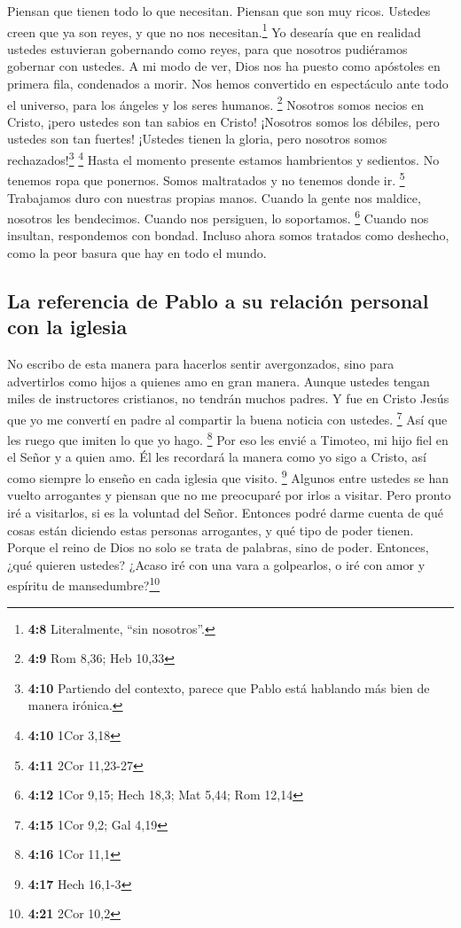  Piensan que tienen todo lo que necesitan. Piensan que son
muy ricos. Ustedes creen que ya son reyes, y que no nos
necesitan.\footnote{\textbf{4:8} Literalmente, ``sin nosotros''.} Yo
desearía que en realidad ustedes estuvieran gobernando como reyes, para
que nosotros pudiéramos gobernar con ustedes.  A mi modo
de ver, Dios nos ha puesto como apóstoles en primera fila, condenados a
morir. Nos hemos convertido en espectáculo ante todo el universo, para
los ángeles y los seres humanos. \footnote{\textbf{4:9} Rom 8,36; Heb
  10,33}  Nosotros somos necios en Cristo, ¡pero ustedes
son tan sabios en Cristo! ¡Nosotros somos los débiles, pero ustedes son
tan fuertes! ¡Ustedes tienen la gloria, pero nosotros somos
rechazados!\footnote{\textbf{4:10} Partiendo del contexto, parece que
  Pablo está hablando más bien de manera irónica.} \footnote{\textbf{4:10}
  1Cor 3,18}  Hasta el momento presente estamos
hambrientos y sedientos. No tenemos ropa que ponernos. Somos maltratados
y no tenemos donde ir. \footnote{\textbf{4:11} 2Cor 11,23-27}
 Trabajamos duro con nuestras propias manos. Cuando la
gente nos maldice, nosotros les bendecimos. Cuando nos persiguen, lo
soportamos. \footnote{\textbf{4:12} 1Cor 9,15; Hech 18,3; Mat 5,44; Rom
  12,14}  Cuando nos insultan, respondemos con bondad.
Incluso ahora somos tratados como deshecho, como la peor basura que hay
en todo el mundo.

\hypertarget{la-referencia-de-pablo-a-su-relaciuxf3n-personal-con-la-iglesia}{%
\subsection{La referencia de Pablo a su relación personal con la
iglesia}\label{la-referencia-de-pablo-a-su-relaciuxf3n-personal-con-la-iglesia}}

 No escribo de esta manera para hacerlos sentir
avergonzados, sino para advertirlos como hijos a quienes amo en gran
manera.  Aunque ustedes tengan miles de instructores
cristianos, no tendrán muchos padres. Y fue en Cristo Jesús que yo me
convertí en padre al compartir la buena noticia con ustedes. \footnote{\textbf{4:15}
  1Cor 9,2; Gal 4,19}  Así que les ruego que imiten lo
que yo hago. \footnote{\textbf{4:16} 1Cor 11,1}  Por eso
les envié a Timoteo, mi hijo fiel en el Señor y a quien amo. Él les
recordará la manera como yo sigo a Cristo, así como siempre lo enseño en
cada iglesia que visito. \footnote{\textbf{4:17} Hech 16,1-3}
 Algunos entre ustedes se han vuelto arrogantes y piensan
que no me preocuparé por irlos a visitar.  Pero pronto
iré a visitarlos, si es la voluntad del Señor. Entonces podré darme
cuenta de qué cosas están diciendo estas personas arrogantes, y qué tipo
de poder tienen.  Porque el reino de Dios no solo se
trata de palabras, sino de poder.  Entonces, ¿qué quieren
ustedes? ¿Acaso iré con una vara a golpearlos, o iré con amor y espíritu
de mansedumbre?\footnote{\textbf{4:21} 2Cor 10,2}

